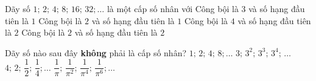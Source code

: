 \begin{ex}%
	 Dãy số $1;\, 2;\, 4;\, 8;\, 16;\, 32; \ldots$ là một cấp số nhân với
	 \choice
		{Công bội là $3$  và số hạng đầu tiên là $1$}
		{\True Công bội là $2$ và số hạng đầu tiên là  $1$}
		{Công bội là $4$ và số hạng  đầu tiên là $2$}
		{Công bội là $2$ và số hạng đầu tiên là $2$} 
\end{ex}

\begin{ex}%
	 Dãy số nào sau đây \textbf{không} phải là cấp số nhân?
	\choice 
		{$1;\, 2;\, 4;\,  8; \ldots$}
		 {$3;\, 3^2;\, 3^3;\, 3^4;\, \ldots$}
		{$4;\, 2;\,  \dfrac{1}{2};\, \dfrac{1}{4}; \ldots$}
		{\True $\dfrac{1}{\pi};\, \dfrac{1}{\pi^2};\,  \dfrac{1}{\pi^4};\, \dfrac{1}{\pi^6}; \ldots$}
\end{ex}

